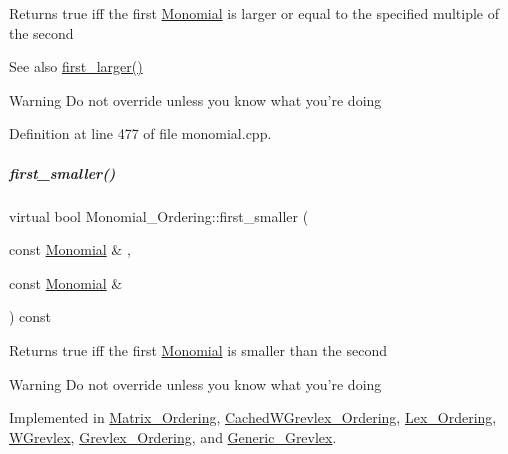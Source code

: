 \begin{DoxyReturn}{Returns}
{\ttfamily true} iff the first \hyperlink{group__polygroup_class_monomial}{Monomial} is larger or equal to the specified multiple of the second 
\end{DoxyReturn}
\begin{DoxySeeAlso}{See also}
\hyperlink{group__orderinggroup_aed41fe82e1ca5cd287a93d287fee7c20}{first\+\_\+larger()} 
\end{DoxySeeAlso}
\begin{DoxyWarning}{Warning}
Do not override unless you know what you're doing 
\end{DoxyWarning}


Definition at line 477 of file monomial.\+cpp.

\mbox{\label{group__orderinggroup_ab6c02638f87382f7a9a95b994e9a5dfb}} 
\subparagraph{\texorpdfstring{first\+\_\+smaller()}{first\_smaller()}}
{\footnotesize\ttfamily virtual bool Monomial\+\_\+\+Ordering\+::first\+\_\+smaller (\begin{DoxyParamCaption}\item[{const \hyperlink{group__polygroup_class_monomial}{Monomial} \&}]{,  }\item[{const \hyperlink{group__polygroup_class_monomial}{Monomial} \&}]{ }\end{DoxyParamCaption}) const\hspace{0.3cm}{\ttfamily [pure virtual]}}

\begin{DoxyReturn}{Returns}
{\ttfamily true} iff the first \hyperlink{group__polygroup_class_monomial}{Monomial} is smaller than the second 
\end{DoxyReturn}
\begin{DoxyWarning}{Warning}
Do not override unless you know what you're doing 
\end{DoxyWarning}


Implemented in \hyperlink{group__orderinggroup_ab7881ff6bbc52d02bf786ef8ab8c5c37}{Matrix\+\_\+\+Ordering}, \hyperlink{group__orderinggroup_a131b09d8226c2dc5f0718f90ab8e009f}{Cached\+W\+Grevlex\+\_\+\+Ordering}, \hyperlink{group__orderinggroup_ae42ea2c7b8fa45bcb46e56480d5f8abb}{Lex\+\_\+\+Ordering}, \hyperlink{group__orderinggroup_a0e4327be4c18de7180ba2cd8c2f9d549}{W\+Grevlex}, \hyperlink{group__orderinggroup_abb1afdfa6ace5b90e425d0645e278c67}{Grevlex\+\_\+\+Ordering}, and \hyperlink{group__orderinggroup_a48ba39468e17d826988b28f5d871d868}{Generic\+\_\+\+Grevlex}.

